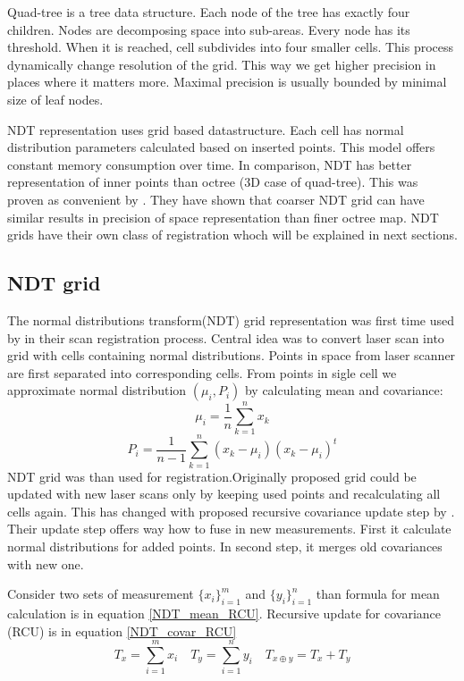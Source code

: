 Quad-tree is a tree data structure. Each node of the tree has exactly four children. Nodes are decomposing space into sub-areas. Every node has its threshold. When it is reached, cell subdivides into four smaller cells. This process dynamically change resolution of the grid. This way we get higher precision in places where it matters more. Maximal precision is usually bounded by minimal size of leaf nodes.

\gls{NDT} representation uses grid based datastructure. Each cell has normal distribution parameters calculated based on inserted points. This model offers constant memory consumption over time. In comparison, \gls{NDT} has better representation of inner points than octree (3D case of quad-tree). This was proven as convenient by \cite{Saarinen13}. They have shown that coarser \gls{NDT} grid can have similar results in precision of space representation than finer octree map. \gls{NDT} grids have their own class of registration whoch will be explained in next sections.     
\newpage


\subsection{NDT grid}
\label{subsec:NDT_grid}
The normal distributions transform(NDT) grid representation was first time used by \cite{Biber03} in their scan registration process. Central idea was to convert laser scan into grid with cells containing normal distributions. Points in space from laser scanner are first separated into corresponding cells. From points in sigle cell we approximate normal distribution $(\mu_{i},P_{i})$ by calculating mean and covariance:
\begin{equation}
\mu_{i} = \dfrac{1}{n}\sum_{k=1}^{n}x_{k}
\end{equation}  
\begin{equation}
P_{i} = \dfrac{1}{n-1}\sum_{k=1}^{n}(x_{k}-\mu_{i})(x_{k}-\mu_{i})^{t}
\end{equation} 
NDT grid was than used for registration.Originally proposed grid could be updated with new laser scans only by keeping used points and recalculating all cells again. This has changed with proposed recursive covariance update step by \cite{Saarinen13}. Their update step offers way how to fuse in new measurements. First it calculate normal distributions for added points. In second step, it merges old covariances with new one.

Consider two sets of measurement $\{x_{i}\}^{m}_{i=1}$ and $\{y_{i}\}^{n}_{i=1}$ than formula for mean calculation is in equation \eqref{NDT_mean_RCU}. Recursive update for covariance (RCU) is in equation \eqref{NDT_covar_RCU}
\begin{equation}
T_{x} = \sum_{i =1}^{m}x_{i} \quad
T_{y} = \sum_{i =1}^{n}y_{i} \quad
T_{x\oplus y} = T_{x} + T_{y} 
\end{equation}

